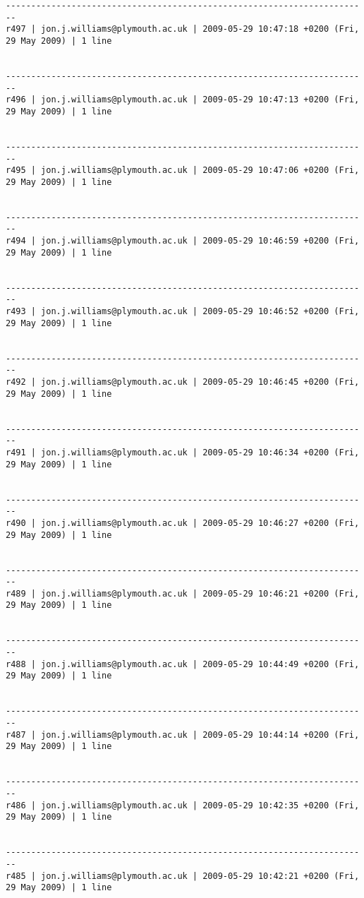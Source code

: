 \documentclass[9]{report}
\begin{document}
\begin{description}
\begin{verbatim}
------------------------------------------------------------------------
r497 | jon.j.williams@plymouth.ac.uk | 2009-05-29 10:47:18 +0200 (Fri, 29 May 2009) | 1 line


------------------------------------------------------------------------
r496 | jon.j.williams@plymouth.ac.uk | 2009-05-29 10:47:13 +0200 (Fri, 29 May 2009) | 1 line


------------------------------------------------------------------------
r495 | jon.j.williams@plymouth.ac.uk | 2009-05-29 10:47:06 +0200 (Fri, 29 May 2009) | 1 line


------------------------------------------------------------------------
r494 | jon.j.williams@plymouth.ac.uk | 2009-05-29 10:46:59 +0200 (Fri, 29 May 2009) | 1 line


------------------------------------------------------------------------
r493 | jon.j.williams@plymouth.ac.uk | 2009-05-29 10:46:52 +0200 (Fri, 29 May 2009) | 1 line


------------------------------------------------------------------------
r492 | jon.j.williams@plymouth.ac.uk | 2009-05-29 10:46:45 +0200 (Fri, 29 May 2009) | 1 line


------------------------------------------------------------------------
r491 | jon.j.williams@plymouth.ac.uk | 2009-05-29 10:46:34 +0200 (Fri, 29 May 2009) | 1 line


------------------------------------------------------------------------
r490 | jon.j.williams@plymouth.ac.uk | 2009-05-29 10:46:27 +0200 (Fri, 29 May 2009) | 1 line


------------------------------------------------------------------------
r489 | jon.j.williams@plymouth.ac.uk | 2009-05-29 10:46:21 +0200 (Fri, 29 May 2009) | 1 line


------------------------------------------------------------------------
r488 | jon.j.williams@plymouth.ac.uk | 2009-05-29 10:44:49 +0200 (Fri, 29 May 2009) | 1 line


------------------------------------------------------------------------
r487 | jon.j.williams@plymouth.ac.uk | 2009-05-29 10:44:14 +0200 (Fri, 29 May 2009) | 1 line


------------------------------------------------------------------------
r486 | jon.j.williams@plymouth.ac.uk | 2009-05-29 10:42:35 +0200 (Fri, 29 May 2009) | 1 line


------------------------------------------------------------------------
r485 | jon.j.williams@plymouth.ac.uk | 2009-05-29 10:42:21 +0200 (Fri, 29 May 2009) | 1 line



\end{verbatim}
\end{description}
\end{document}
